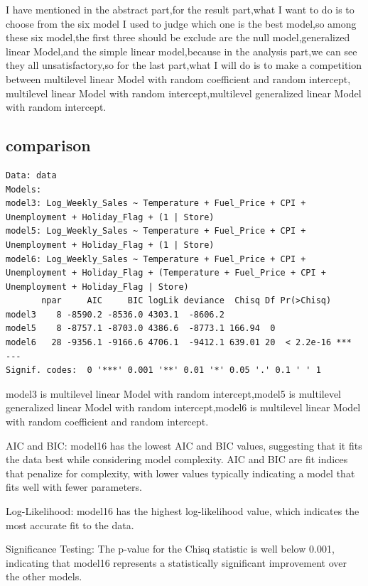 \documentclass[
  letterpaper,
  DIV=11,
  numbers=noendperiod]{scrartcl}
\begin{document}
I have mentioned in the abstract part,for the result part,what I want to
do is to choose from the six model I used to judge which one is the best
model,so among these six model,the first three should be exclude are the
null model,generalized linear Model,and the simple linear model,because
in the analysis part,we can see they all unsatisfactory,so for the last
part,what I will do is to make a competition between multilevel linear
Model with random coefficient and random intercept, multilevel linear
Model with random intercept,multilevel generalized linear Model with
random intercept.

\hypertarget{comparison}{%
\subsection{comparison}\label{comparison}}

\begin{verbatim}
Data: data
Models:
model3: Log_Weekly_Sales ~ Temperature + Fuel_Price + CPI + Unemployment + Holiday_Flag + (1 | Store)
model5: Log_Weekly_Sales ~ Temperature + Fuel_Price + CPI + Unemployment + Holiday_Flag + (1 | Store)
model6: Log_Weekly_Sales ~ Temperature + Fuel_Price + CPI + Unemployment + Holiday_Flag + (Temperature + Fuel_Price + CPI + Unemployment + Holiday_Flag | Store)
       npar     AIC     BIC logLik deviance  Chisq Df Pr(>Chisq)    
model3    8 -8590.2 -8536.0 4303.1  -8606.2                         
model5    8 -8757.1 -8703.0 4386.6  -8773.1 166.94  0               
model6   28 -9356.1 -9166.6 4706.1  -9412.1 639.01 20  < 2.2e-16 ***
---
Signif. codes:  0 '***' 0.001 '**' 0.01 '*' 0.05 '.' 0.1 ' ' 1
\end{verbatim}

model3 is multilevel linear Model with random intercept,model5 is
multilevel generalized linear Model with random intercept,model6 is
multilevel linear Model with random coefficient and random intercept.

AIC and BIC: model16 has the lowest AIC and BIC values, suggesting that
it fits the data best while considering model complexity. AIC and BIC
are fit indices that penalize for complexity, with lower values
typically indicating a model that fits well with fewer parameters.

Log-Likelihood: model16 has the highest log-likelihood value, which
indicates the most accurate fit to the data.

Significance Testing: The p-value for the Chisq statistic is well below
0.001, indicating that model16 represents a statistically significant
improvement over the other models.
\end{document}

